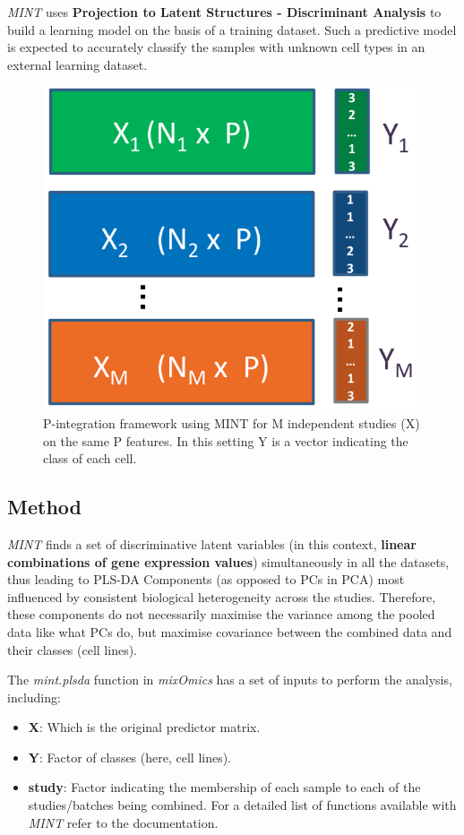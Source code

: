 \documentclass[]{book}
\providecommand{\tightlist}{%
  \setlength{\itemsep}{0pt}\setlength{\parskip}{0pt}}
\theoremstyle{definition}
\theoremstyle{definition}
\theoremstyle{definition}
\theoremstyle{remark}
\begin{document}
\emph{MINT} uses \textbf{Projection to Latent Structures - Discriminant
Analysis} to build a learning model on the basis of a training dataset.
Such a predictive model is expected to accurately classify the samples
with unknown cell types in an external learning dataset.

\begin{figure}[ht]

{\centering \includegraphics[width=0.3\linewidth]{figures/mintframework} 

}

\caption{P-integration framework using MINT for M independent studies (X) on the same P features. In this setting Y is a vector indicating the class of each cell.}\label{fig:1-graphicsMINT}
\end{figure}

\hypertarget{method}{%
\subsection{Method}\label{method}}

\emph{MINT} finds a set of discriminative latent variables (in this
context, \textbf{linear combinations of gene expression values})
simultaneously in all the datasets, thus leading to PLS-DA Components
(as opposed to PCs in PCA) most influenced by consistent biological
heterogeneity across the studies. Therefore, these components do not
necessarily maximise the variance among the pooled data like what PCs
do, but maximise covariance between the combined data and their classes
(cell lines).

The \emph{mint.plsda} function in \emph{mixOmics} has a set of inputs to
perform the analysis, including:

\begin{itemize}
\tightlist
\item
  \textbf{X}: Which is the original predictor matrix.
\item
  \textbf{Y}: Factor of classes (here, cell lines).
\item
  \textbf{study}: Factor indicating the membership of each sample to
  each of the studies/batches being combined. For a detailed list of
  functions available with \emph{MINT} refer to the documentation.
\end{itemize}
\end{document}
